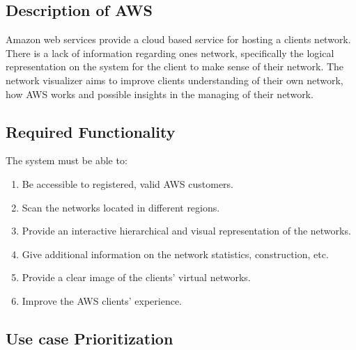 \documentclass[hidelinks,a4paper,12pt]{article}
\begin{document}
		\subsection{Description of AWS}
			Amazon web services provide a cloud based service for hosting a clients network. There is a lack of information regarding ones network, specifically the logical representation on the system for the client to make sense of their network. The network visualizer aims to improve clients understanding of their own network, how AWS works and possible insights in the managing of their network.
		\subsection{Required Functionality}
			The system must be able to:
				\begin{enumerate}  
					\item Be accessible to registered, valid AWS customers.
					\item Scan the networks located in different regions. 
					\item Provide an interactive hierarchical and visual representation of the networks.
					\item Give additional information on the network statistics, construction, etc.
					\item Provide a clear image of the clients' virtual networks.
					\item Improve the AWS clients' experience.
				\end{enumerate}
		\subsection{Use case Prioritization}
		
\end{document}
